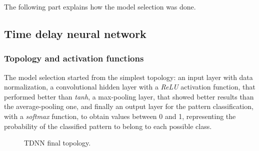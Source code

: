 The following part explains how the model selection was done.
\bigbreak

\subsection{Time delay neural network}
\subsubsection{Topology and activation functions}
The model selection started from the simplest topology: an input layer with data normalization, a convolutional hidden layer with a \textit{ReLU} activation function, that performed better than \textit{tanh}, a max-pooling layer, that showed better results than the average-pooling one, and finally an output layer for the pattern classification, with a \textit{softmax} function, to obtain values between 0 and 1, representing the probability of the classified pattern to belong to each possible class.
\bigbreak

\begin{center}
	\begin{figure}[ht!]
		\caption{TDNN final topology.}
	\end{figure}
\end{center}

